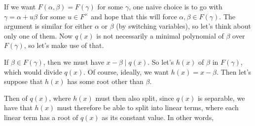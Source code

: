 \documentclass[notoc,notitlepage,nobib]{tufte-book}
\begin{document}
\begin{strategy}\label{strategy:analysis_of_proof_of_primitive_element_theorem}
  If we want $F(\alpha, \beta) = F(\gamma)$ for some $\gamma$, one naive
  choice is to go with $\gamma = \alpha + u \beta$ for some $u \in F^\times$
  and hope that this will force $\alpha, \beta \in F(\gamma)$. The argument is
  similar for either $\alpha$ or $\beta$ (by switching variables), so let's
  think about only one of them. Now $q(x)$ is not necessarily a minimal
  polynomial of $\beta$ over $F(\gamma)$, so let's make use of that.

  If $\beta \in F(\gamma)$, then we must have $x - \beta \mid q(x)$. So let's
   $h(x)$ of $\beta$ in $F(\gamma)$,
  which would divide $q(x)$. Of course, ideally, we want $h(x) = x - \beta$.
  Then let's suppose that $h(x)$ has some root other than $\beta$.

  Then  of $q(x)$, where $h(x)$ must then also
  split, since $q(x)$ is separable, we have that $h(x)$ must therefore be able
  to split into linear terms, where each linear term has a root of $q(x)$ as its
  constant value. In other words,  


\end{strategy}
\end{document}
